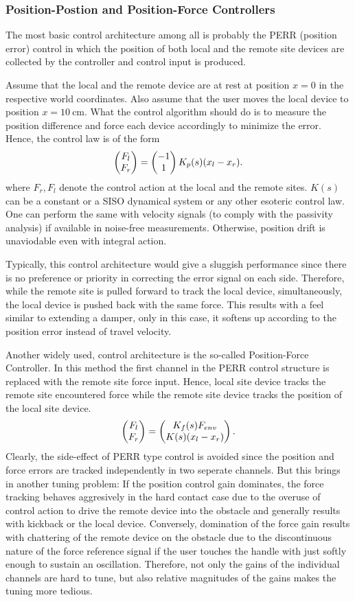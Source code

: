 \subsubsection{Position-Postion and Position-Force Controllers}
The most basic control architecture among all is probably the PERR (position error) control in which the 
position of both local and the remote site devices are collected by the controller and control input is
produced.

Assume that the local and the remote device are at rest at position $x=0$ in the respective world coordinates. 
Also assume that the user moves the local device to position $x=\SI{10}{\centi\metre}$. What the control algorithm
should do is to measure the position difference and force each device accordingly to minimize the error. Hence, the
control law is of the form
\[
\begin{pmatrix}F_l\\F_r\end{pmatrix} = \begin{pmatrix}-1\\1\end{pmatrix} K_p(s) (x_l-x_r).
\]
where $F_r,F_l$ denote the control action at the local and the remote sites. $K(s)$ can be a constant or a SISO dynamical 
system or any other esoteric control law. One can perform the same with velocity signals (to comply with the passivity 
analysis) if available in noise-free measurements. Otherwise, position drift is unaviodable even with integral action. 

Typically, this control architecture would give a sluggish performance since there is no preference or priority in 
correcting the error signal on each side. Therefore, while the remote site is pulled forward to track the local device,
simultaneously, the local device is pushed back with the same force. This results with a feel similar to extending a 
damper, only in this case, it softens up according to the position error instead of travel velocity.

Another widely used, control architecture is the so-called Position-Force Controller. In this method the first channel 
in the PERR control structure is replaced with the remote site force input. Hence, local site device tracks the remote site 
encountered force while the remote site device tracks the position of the local site device. 
\[
\begin{pmatrix}F_l\\F_r\end{pmatrix} = \begin{pmatrix}K_f(s)F_{env} \\ K(s) (x_l-x_r)\end{pmatrix}.
\]
Clearly, the side-effect of PERR type control is avoided since the position and force errors are tracked independently 
in two seperate channels. But this brings in another tuning problem: If the position control gain dominates, the force tracking 
behaves aggresively in the hard contact case due to the overuse of control action to drive the remote device into the obstacle
and generally results with kickback or the local device. Conversely, domination of the force gain results with chattering of 
the remote device on the obstacle due to the discontinuous nature of the force reference signal if the user touches the handle 
with just softly enough to sustain an oscillation. Therefore, not only the gains of the individual channels are hard to tune, but
also relative magnitudes of the gains makes the tuning more tedious.

